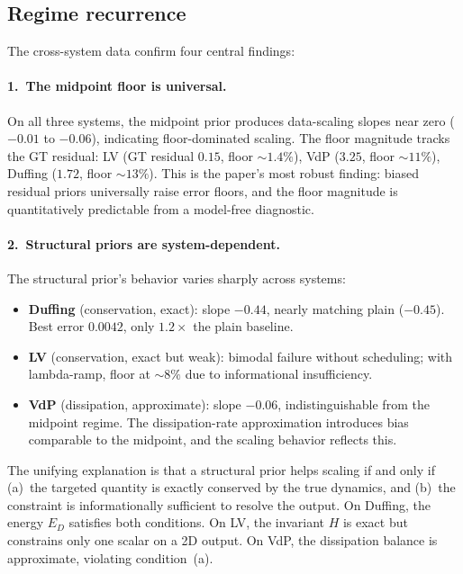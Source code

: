 \documentclass[11pt]{article}
\begin{document}
\subsection{Regime recurrence}

The cross-system data confirm four central findings:

\paragraph{1.\ The midpoint floor is universal.}
On all three systems, the midpoint prior produces data-scaling slopes near zero ($-0.01$ to $-0.06$), indicating floor-dominated scaling.
The floor magnitude tracks the GT residual: LV (GT residual $0.15$, floor $\sim\!1.4\%$), VdP ($3.25$, floor $\sim\!11\%$), Duffing ($1.72$, floor $\sim\!13\%$).
This is the paper's most robust finding: biased residual priors universally raise error floors, and the floor magnitude is quantitatively predictable from a model-free diagnostic.

\paragraph{2.\ Structural priors are system-dependent.}
The structural prior's behavior varies sharply across systems:
\begin{itemize}[leftmargin=*]
    \item \textbf{Duffing} (conservation, exact): slope $-0.44$, nearly matching plain ($-0.45$).
    Best error $0.0042$, only $1.2\times$ the plain baseline.
    \item \textbf{LV} (conservation, exact but weak): bimodal failure without scheduling; with lambda-ramp, floor at $\sim\!8\%$ due to informational insufficiency.
    \item \textbf{VdP} (dissipation, approximate): slope $-0.06$, indistinguishable from the midpoint regime.
    The dissipation-rate approximation introduces bias comparable to the midpoint, and the scaling behavior reflects this.
\end{itemize}
The unifying explanation is that a structural prior helps scaling if and only if (a)~the targeted quantity is exactly conserved by the true dynamics, and (b)~the constraint is informationally sufficient to resolve the output.
On Duffing, the energy $E_D$ satisfies both conditions.
On LV, the invariant $H$ is exact but constrains only one scalar on a 2D output.
On VdP, the dissipation balance is approximate, violating condition~(a).
\end{document}
